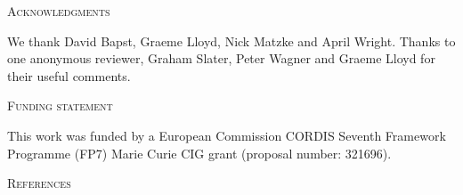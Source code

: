 \documentclass[12pt,letterpaper]{article}
\renewcommand{\section}[1]{%
\bigskip
\begin{center}
\begin{Large}
\normalfont\scshape #1
\medskip
\end{Large}
\end{center}}
\begin{document}
\section{Acknowledgments}
We thank David Bapst, Graeme Lloyd, Nick Matzke and April Wright.
Thanks to one anonymous reviewer, Graham Slater, Peter Wagner and Graeme Lloyd for their useful comments.
\section{Funding statement}
This work was funded by a European Commission CORDIS Seventh Framework Programme (FP7) Marie Curie CIG grant (proposal number: 321696).

\section{References}




\end{document}

